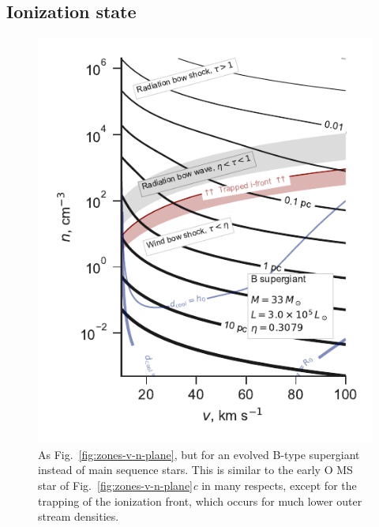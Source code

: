 
\subsection{Ionization state}
\label{sec:trapp-ioniz-front}

\begin{figure}
  \includegraphics[width=\linewidth]{figs/zones-v-n-plane-BSG}
  \caption{As Fig.~\ref{fig:zones-v-n-plane}, but for an evolved
    B-type supergiant instead of main sequence stars.  This is similar
    to the early O MS star of Fig.~\ref{fig:zones-v-n-plane}\textit{c}
    in many respects, except for the trapping of the ionization front,
    which occurs for much lower outer stream densities.}
  \label{fig:B-supergiant}
\end{figure}

